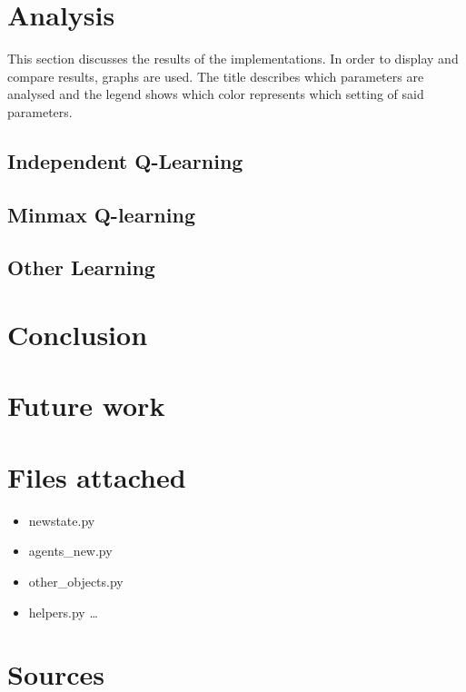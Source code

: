 \documentclass{article}
\begin{document}
\pagebreak


\section{Analysis}
This section discusses the results of the implementations. In order to display and compare results, graphs are used. The title describes which parameters are analysed and the legend shows which color represents which setting of said parameters.

\subsection{Independent Q-Learning}

\subsection{Minmax Q-learning}

\subsection{Other Learning}

\pagebreak


\section{Conclusion}

\pagebreak


\section{Future work}

\pagebreak


\section{Files attached}

\begin{itemize}
\item newstate.py
\item agents\_new.py
\item other\_objects.py
\item helpers.py \ldots
\end{itemize}


\section{Sources}

\nocite{*}
\printbibliography


\begin{comment}


\begin{itemize}
	\item [1] Barto and Sutton (http://webdocs.cs.ualberta.ca/~sutton/book/the-book.html) \ldots
\end{itemize}
\end{comment}
\end{document}
